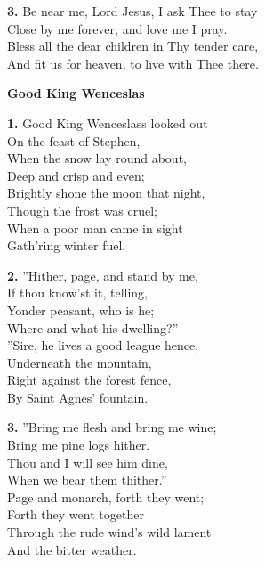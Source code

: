 \documentclass[a5paper,12pt]{article}
\begin{document}
\textbf{3.} Be near me, Lord Jesus, I ask Thee to stay\\
Close by me forever, and love me I pray.\\
Bless all the dear children in Thy tender care,\\
And fit us for heaven, to live with Thee there.

\newpage

\begin{center}{\Large\bfseries Good King Wenceslas}\end{center}
\vspace{0.3em}
\textbf{1.} Good King Wenceslass looked out\\
On the feast of Stephen,\\
When the snow lay round about,\\
Deep and crisp and even;\\
Brightly shone the moon that night,\\
Though the frost was cruel;\\
When a poor man came in sight\\
Gath'ring winter fuel.

\textbf{2.} ''Hither, page, and stand by me,\\
If thou know'st it, telling,\\
Yonder peasant, who is he;\\
Where and what his dwelling?''\\
''Sire, he lives a good league hence,\\
Underneath the mountain,\\
Right against the forest fence,\\
By Saint Agnes' fountain.

\textbf{3.} ''Bring me flesh and bring me wine;\\
Bring me pine logs hither.\\
Thou and I will see him dine,\\
When we bear them thither.''\\
Page and monarch, forth they went;\\
Forth they went together\\
Through the rude wind's wild lament\\
And the bitter weather.
\end{document}
